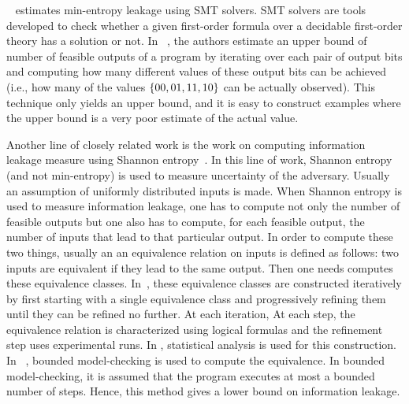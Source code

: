 ~\cite{Plas11, Plas13} estimates min-entropy leakage using SMT solvers. SMT solvers are tools developed to check whether a given first-order formula over a decidable first-order theory has a solution or not.  In ~\cite{Plas11, Plas13}, the authors estimate an upper bound of number of feasible outputs of a program by iterating over each pair of output bits and computing how many different values of these output bits can be achieved (i.e., how many of the values $\{ 00,01,11,10 \}$ can be actually observed).  This technique only yields an upper bound, and it is easy to construct examples where the upper bound is a very poor estimate of the actual value.
 


Another line of closely related work is the work on computing information leakage measure using Shannon entropy~\cite{BackesKopf,Malacria07}. In this line of work, 
Shannon entropy (and not min-entropy) is used to measure uncertainty of the adversary. Usually an assumption of uniformly distributed inputs is made. When Shannon entropy is used to measure information leakage, one has to compute not only the number of feasible outputs but one also has to compute, for each feasible output,  the number of inputs that lead to that particular output. In order to compute these two things, usually an an equivalence relation on inputs is defined as follows: two inputs are equivalent if they lead to the same output. Then one needs computes these equivalence classes. In~\cite{BackesKopf}, these equivalence classes are constructed iteratively by first starting with a single equivalence class and progressively refining them until they can be refined no further. At each iteration,  At each step, the equivalence relation is characterized using logical formulas and the refinement step uses experimental runs. In \cite{Kopf}, statistical analysis is used for this construction. In ~\cite{Malacria07}, bounded model-checking is used to compute the equivalence. In bounded model-checking, it is assumed that the program executes at most a bounded number of steps. Hence, this method gives a lower bound on information leakage. 

%
%
%
%
